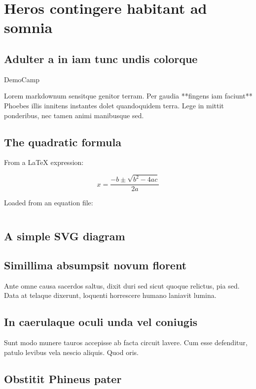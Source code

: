 \documentclass{article}
\begin{document}
\section{Heros contingere habitant ad somnia}

\subsection{Adulter a in iam tunc undis colorque}

DemoCamp

Lorem markdownum sensitque genitor terram. Per gaudia **fingens iam faciunt**
Phoebes illis innitens instantes dolet quandoquidem terra. Lege in mittit
ponderibus, nec tamen animi manibusque sed.

\subsection{The quadratic formula}

From a LaTeX expression:

$$x=\frac{-b \pm \sqrt{b^2 - 4ac}}{2a}$$

Loaded from an equation file:

$$$$

\subsection{A simple SVG diagram}

\subsection{Simillima absumpsit novum florent}

Ante omne causa sacerdos saltus, dixit duri sed sicut quoque relictus, pia sed.
Data at telaque dixerunt, loquenti horrescere humano laniavit lumina.

\subsection{In caerulaque oculi unda vel coniugis}

Sunt modo munere tauros accepisse ab facta circuit lavere. Cum esse defenditur,
patulo levibus vela nescio aliquis. Quod oris.

\subsection{Obstitit Phineus pater}
\end{document}
